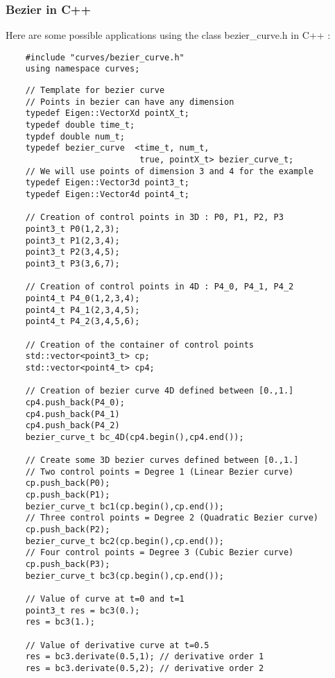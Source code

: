 \documentclass{article}
\begin{document}
    \subsubsection{Bezier in C++}

    Here are some possible applications using the class bezier\_curve.h in C++ :\\
    \begin{lstlisting}
    #include "curves/bezier_curve.h"
    using namespace curves;
    \end{lstlisting}
    \begin{lstlisting}
    // Template for bezier curve
    // Points in bezier can have any dimension
    typedef Eigen::VectorXd pointX_t;
    typedef double time_t;
    typdef double num_t;
    typedef bezier_curve  <time_t, num_t,
                           true, pointX_t> bezier_curve_t;
    // We will use points of dimension 3 and 4 for the example
    typedef Eigen::Vector3d point3_t;
    typedef Eigen::Vector4d point4_t;

    // Creation of control points in 3D : P0, P1, P2, P3
    point3_t P0(1,2,3);
    point3_t P1(2,3,4);
    point3_t P2(3,4,5);
    point3_t P3(3,6,7);

    // Creation of control points in 4D : P4_0, P4_1, P4_2
    point4_t P4_0(1,2,3,4);
    point4_t P4_1(2,3,4,5);
    point4_t P4_2(3,4,5,6);

    // Creation of the container of control points
    std::vector<point3_t> cp;
    std::vector<point4_t> cp4;

    // Creation of bezier curve 4D defined between [0.,1.]
    cp4.push_back(P4_0);
    cp4.push_back(P4_1)
    cp4.push_back(P4_2)
    bezier_curve_t bc_4D(cp4.begin(),cp4.end());

    // Create some 3D bezier curves defined between [0.,1.]
    // Two control points = Degree 1 (Linear Bezier curve)
    cp.push_back(P0);
    cp.push_back(P1);
    bezier_curve_t bc1(cp.begin(),cp.end());
    // Three control points = Degree 2 (Quadratic Bezier curve)
    cp.push_back(P2);
    bezier_curve_t bc2(cp.begin(),cp.end());
    // Four control points = Degree 3 (Cubic Bezier curve)
    cp.push_back(P3);
    bezier_curve_t bc3(cp.begin(),cp.end());

    // Value of curve at t=0 and t=1
    point3_t res = bc3(0.);
    res = bc3(1.);

    // Value of derivative curve at t=0.5
    res = bc3.derivate(0.5,1); // derivative order 1
    res = bc3.derivate(0.5,2); // derivative order 2


\end{lstlisting}
\end{document}
